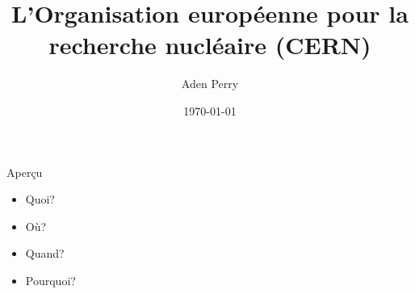 \documentclass[aspectratio=43]{beamer}
\title[CERN]{L'Organisation européenne pour la recherche nucléaire (CERN)}
\author[Perry]{Aden Perry}
\institute{R.I.T.}
\date{\today}
\begin{document}
%
\maketitle



\begin{frame}{Aperçu}
	\begin{itemize}
		\item Quoi?

		\item Où? 

		\item Quand?

		\item Pourquoi? 
	\end{itemize}
\end{frame}
\end{document}
